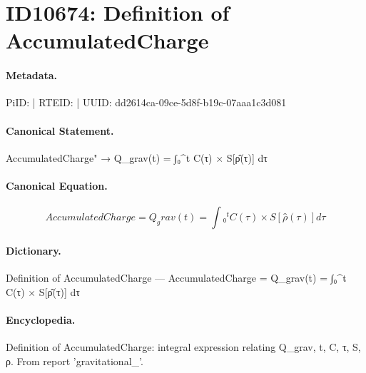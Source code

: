 \section*{ID10674: Definition of AccumulatedCharge}
\paragraph{Metadata.}
PiID:  | RTEID:  | UUID: dd2614ca-09ce-5d8f-b19c-07aaa1c3d081

\paragraph{Canonical Statement.}
AccumulatedCharge" → Q\_grav(t) = ∫₀\textasciicircum{}t C(τ) × S[ρ̂(τ)] dτ

\paragraph{Canonical Equation.}
\[
AccumulatedCharge = Q_grav(t) = ∫₀^t C(τ) × S[ρ̂(τ)] dτ
\]

\paragraph{Dictionary.}
Definition of AccumulatedCharge — AccumulatedCharge = Q\_grav(t) = ∫₀\textasciicircum{}t C(τ) × S[ρ̂(τ)] dτ

\paragraph{Encyclopedia.}
Definition of AccumulatedCharge: integral expression relating Q\_grav, t, C, τ, S, ρ. From report 'gravitational\_'.
